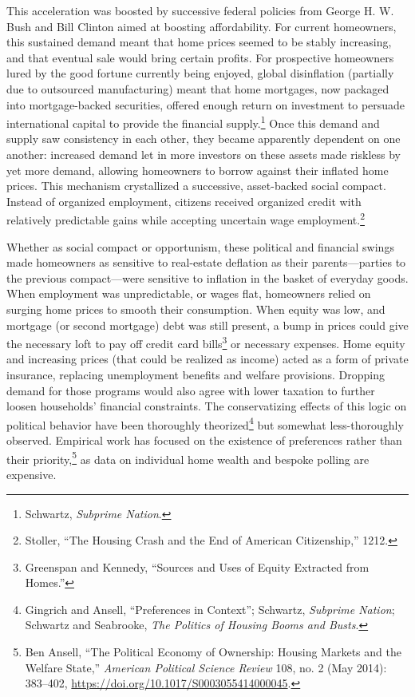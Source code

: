 \documentclass[12pt,oneside]{psthesis}
\begin{document}
This acceleration was boosted by successive federal policies from George H. W. Bush and Bill Clinton aimed at boosting affordability.
For current homeowners, this sustained demand meant that home prices seemed to be stably increasing, and that eventual sale would bring certain profits.
For prospective homeowners lured by the good fortune currently being enjoyed, global disinflation (partially due to outsourced manufacturing) meant that home mortgages, now packaged into mortgage-backed securities, offered enough return on investment to persuade international capital to provide the financial supply.\footnote{Schwartz, \emph{Subprime Nation}.}
Once this demand and supply saw consistency in each other, they became apparently dependent on one another: increased demand let in more investors on these assets made riskless by yet more demand, allowing homeowners to borrow against their inflated home prices.
This mechanism crystallized a successive, asset-backed social compact.
Instead of organized employment, citizens received organized credit with relatively predictable gains while accepting uncertain wage employment.\footnote{Stoller, ``The Housing Crash and the End of American Citizenship,'' 1212.}

Whether as social compact or opportunism, these political and financial swings made homeowners as sensitive to real-estate deflation as their parents---parties to the previous compact---were sensitive to inflation in the basket of everyday goods.
When employment was unpredictable, or wages flat, homeowners relied on surging home prices to smooth their consumption.
When equity was low, and mortgage (or second mortgage) debt was still present, a bump in prices could give the necessary loft to pay off credit card bills\footnote{Greenspan and Kennedy, ``Sources and Uses of Equity Extracted from Homes.''} or necessary expenses.
Home equity and increasing prices (that could be realized as income) acted as a form of private insurance, replacing unemployment benefits and welfare provisions.
Dropping demand for those programs would also agree with lower taxation to further loosen households' financial constraints.
The conservatizing effects of this logic on political behavior have been thoroughly theorized\footnote{Gingrich and Ansell, ``Preferences in Context''; Schwartz, \emph{Subprime Nation}; Schwartz and Seabrooke, \emph{The Politics of Housing Booms and Busts}.} but somewhat less-thoroughly observed.
Empirical work has focused on the existence of preferences rather than their priority,\footnote{Ben Ansell, ``The Political Economy of Ownership: Housing Markets and the Welfare State,'' \emph{American Political Science Review} 108, no. 2 (May 2014): 383--402, \url{https://doi.org/10.1017/S0003055414000045}.} as data on individual home wealth and bespoke polling are expensive.
\end{document}
